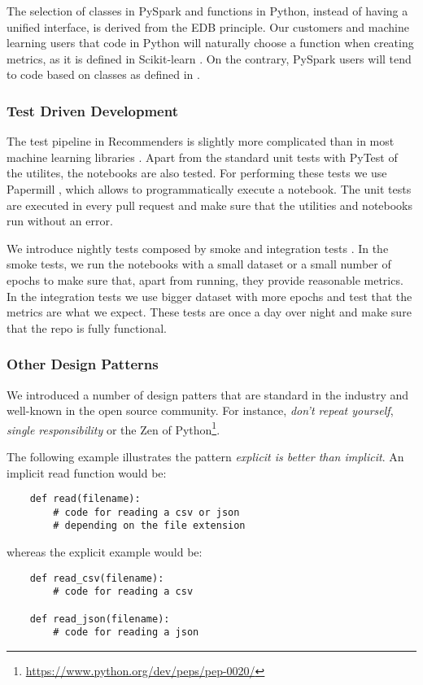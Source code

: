 The selection of classes in PySpark and functions in Python, instead of having a unified
interface, is derived from the EDB principle. Our customers and machine learning users
that code in Python will naturally choose a function when creating metrics, as it is
defined in Scikit-learn \cite{pedregosa2011scikit}. On the contrary, PySpark users 
will tend to code based on classes as defined in \cite{meng2016mllib}. 

\subsubsection{Test Driven Development}

The test pipeline in Recommenders is slightly more complicated than in most machine learning
libraries \cite{abadi2016tensorflow,paszke2017automatic,pedregosa2011scikit,ke2017lightgbm}.
Apart from the standard unit tests with PyTest \cite{krekel2004pytest} of the utilites, 
the notebooks are also tested. For performing these tests we use Papermill 
\cite{nteract2017papermill}, which allows to programmatically execute a notebook. The
unit tests are executed in every pull request and make sure that the utilities and 
notebooks run without an error.

We introduce nightly tests composed by smoke and integration tests 
\cite{gonzalez-fierro2018beginners}. In the smoke tests, we run the notebooks with a 
small dataset or a small number of epochs to make sure that, apart from running, they 
provide reasonable metrics. In the integration tests we use bigger dataset with more 
epochs and test that the metrics are what we expect. These tests are once a day over 
night and make sure that the repo is fully functional.

\subsubsection{Other Design Patterns}

We introduced a number of design patters that are standard in the industry and well-known
in the open source community. For instance, \textit{don't repeat yourself}, \textit{single
responsibility} or the Zen of Python\footnote{\url{https://www.python.org/dev/peps/pep-0020/}}. 

The following example illustrates the pattern \textit{explicit is better than implicit}.
An implicit read function would be: 
\begin{verbatim}
    def read(filename):
        # code for reading a csv or json
        # depending on the file extension
\end{verbatim}

whereas the explicit example would be:
\begin{verbatim}
    def read_csv(filename):
        # code for reading a csv

    def read_json(filename):
        # code for reading a json
\end{verbatim}



